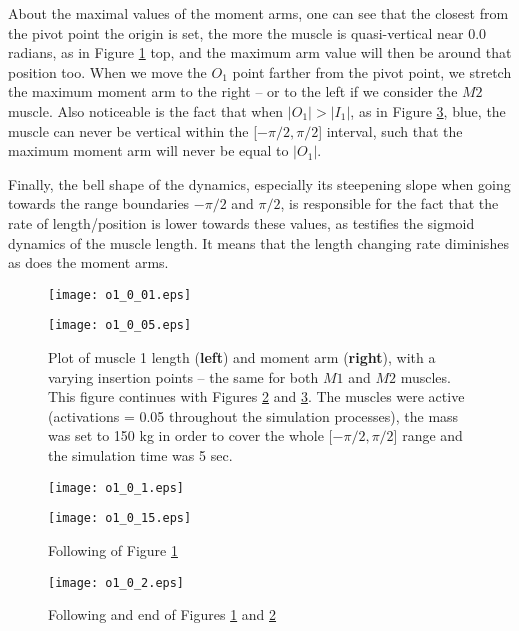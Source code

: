 \documentclass{cmc}
\begin{document}
\newpage
About the maximal values of the moment arms, one can see that the closest from the pivot point the origin is set, the more the muscle is quasi-vertical near 0.0 radians, as in Figure \ref{figure:3_1a} top, and the maximum arm value will then be around that position too. When we move the $O_1$ point farther from the pivot point, we stretch the maximum moment arm to the right -- or to the left if we consider the $M2$ muscle. Also noticeable is the fact that when $\vert O_1\vert > \vert I_1\vert$, as in Figure \ref{figure:3a_1_end}, blue, the muscle can never be vertical within the [$-\pi/2, \pi/2$] interval, such that the maximum moment arm will never be equal to $\vert O_1\vert$.

Finally, the bell shape of the dynamics, especially its steepening slope when going towards the range boundaries $-\pi/2$ and $\pi/2$, is responsible for the fact that the rate of length/position is lower towards these values, as testifies the sigmoid dynamics of the muscle length. It means that the length changing rate diminishes as does the moment arms.

\begin{figure} [H]
\centering
{%
  \texttt{[image: o1\_0\_01.eps]}%
  }\par\medskip
{
  \texttt{[image: o1\_0\_05.eps]}%
  }  
\caption{Plot of muscle 1 length (\textbf{left}) and moment arm (\textbf{right}), with a varying insertion points -- the same for both $M1$ and $M2$ muscles. This figure continues with Figures \ref{figure:3a_1_follow} and \ref{figure:3a_1_end}. The muscles were active (activations = 0.05 throughout the simulation processes), the mass was set to 150 kg in order to cover the whole [$-\pi/2, \pi/2$] range and the simulation time was 5 sec.}
\label{figure:3_1a}
\end{figure}

\begin{figure} [H]
\centering
{%
  \texttt{[image: o1\_0\_1.eps]}%
  }\par\medskip
{%
  \texttt{[image: o1\_0\_15.eps]}%
}
\caption{Following of Figure \ref{figure:3_1a}}
\label{figure:3a_1_follow}
\end{figure}

\begin{figure} [H]
\centering
{%
  \texttt{[image: o1\_0\_2.eps]}%
  }
\caption{Following and end of Figures \ref{figure:3_1a} and \ref{figure:3a_1_follow}}
\label{figure:3a_1_end}
\end{figure}
\end{document}
